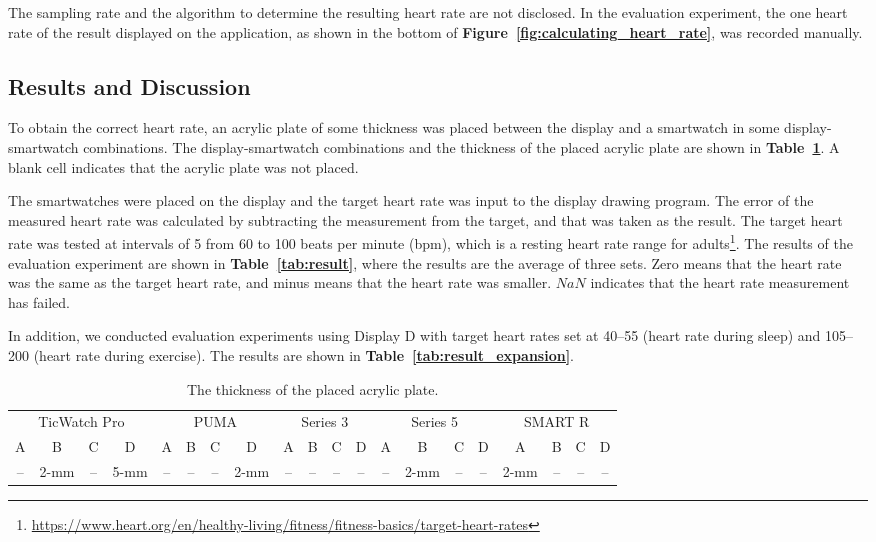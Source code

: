 \documentclass[sigchi,authordraft]{acmart}
\newcommand\figref[1]{\textbf{Figure~\ref{fig:#1}}}
\newcommand\tabref[1]{\textbf{Table~\ref{tab:#1}}}
\begin{document}
The sampling rate and the algorithm to determine the resulting heart rate are not disclosed. In the evaluation experiment, the one heart rate of the result displayed on the application, as shown in the bottom of \figref{calculating_heart_rate}, was recorded manually.


\subsection{Results and Discussion}
To obtain the correct heart rate, an acrylic plate of some thickness was placed between the display and a smartwatch in some display-smartwatch combinations. The display-smartwatch combinations and the thickness of the placed acrylic plate are shown in \tabref{acrylic_plate}. A blank cell indicates that the acrylic plate was not placed.\par

The smartwatches were placed on the display and the target heart rate was input to the display drawing program. The error of the measured heart rate was calculated by subtracting the measurement from the target, and that was taken as the result. The target heart rate was tested at intervals of 5 from 60 to 100 beats per minute (bpm), which is a resting heart rate range for adults\footnote{\url{https://www.heart.org/en/healthy-living/fitness/fitness-basics/target-heart-rates}}. The results of the evaluation experiment are shown in \tabref{result}, where the results are the average of three sets. Zero means that the heart rate was the same as the target heart rate, and minus means that the heart rate was smaller. $NaN$ indicates that the heart rate measurement has failed.\par

In addition, we conducted evaluation experiments using Display D with target heart rates set at 40--55 (heart rate during sleep) and 105--200 (heart rate during exercise). The results are shown in \tabref{result_expansion}.

\begin{table}[!t]
  \small
  \centering
  \caption{The thickness of the placed acrylic plate.}
  \begin{tabular}{cccc|cccc|cccc|cccc|cccc}
  \toprule
    \multicolumn{4}{c|}{TicWatch Pro}&\multicolumn{4}{c|}{PUMA}&\multicolumn{4}{c|}{Series 3}&\multicolumn{4}{c|}{Series 5}&\multicolumn{4}{c}{SMART R} \\
    A & B & C & D & A & B & C & D & A & B & C & D & A & B & C & D & A & B & C & D \\
    \midrule
    -- & 2-mm & -- & 5-mm & -- & -- & -- & 2-mm & -- & -- & -- & -- & -- & 2-mm & -- & -- & 2-mm & -- & -- & -- \\
    \bottomrule
  \end{tabular}
  \label{tab:acrylic_plate}
\end{table}
\end{document}
